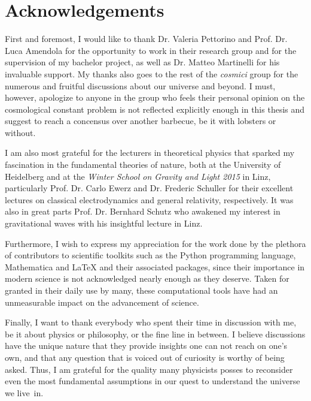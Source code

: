 \cleardoublepage
\chapter{Acknowledgements}

First and foremost, I would like to thank Dr. Valeria Pettorino and Prof. Dr. Luca Amendola for the opportunity to work in their research group and for the supervision of my bachelor project, as well as Dr. Matteo Martinelli for his invaluable support. My thanks also goes to the rest of the \emph{cosmici} group for the numerous and fruitful discussions about our universe and beyond. I must, however, apologize to anyone in the group who feels their personal opinion on the cosmological constant problem is not reflected explicitly enough in this thesis and suggest to reach a concensus over another barbecue, be it with lobsters or without.

I am also most grateful for the lecturers in theoretical physics that sparked my fascination in the fundamental theories of nature, both at the University of Heidelberg and at the \emph{Winter School on Gravity and Light 2015} in Linz, particularly Prof. Dr. Carlo Ewerz and Dr. Frederic Schuller for their excellent lectures on classical electrodynamics and general relativity, respectively. It was also in great parts Prof. Dr. Bernhard Schutz who awakened my interest in gravitational waves with his insightful lecture in Linz.

Furthermore, I wish to express my appreciation for the work done by the plethora of contributors to scientific toolkits such as the Python programming language, Mathematica and \LaTeX{} and their associated packages, since their importance in modern science is not acknowledged nearly enough as they deserve. Taken for granted in their daily use by many, these computational tools have had an unmeasurable impact on the advancement of science.

Finally, I want to thank everybody who spent their time in discussion with me, be it about physics or philosophy, or the fine line in between. I believe discussions have the unique nature that they provide insights one can not reach on one's own, and that any question that is voiced out of curiosity is worthy of being asked. Thus, I am grateful for the quality many physicists posses to reconsider even the most fundamental assumptions in our quest to understand the universe we live~in.

